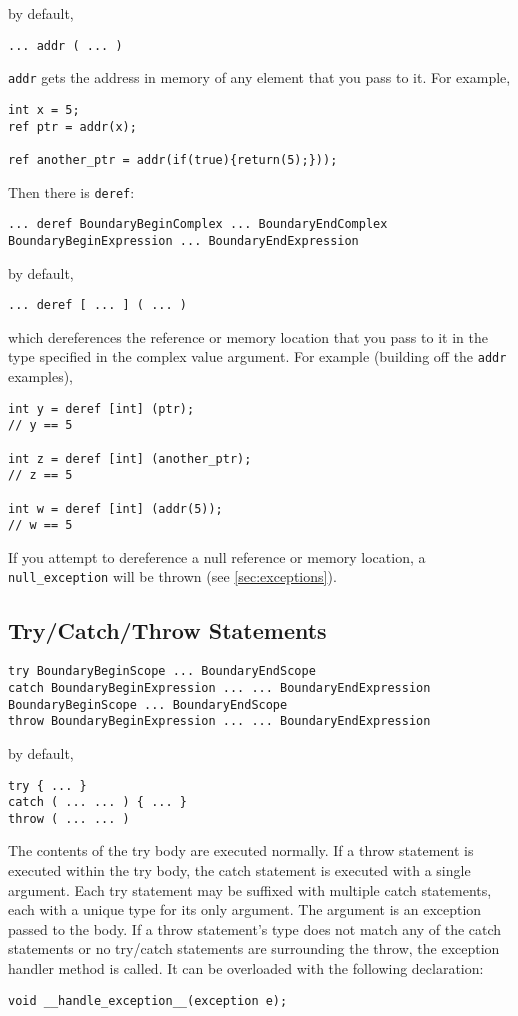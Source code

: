 \documentclass[10pt,a4paper]{article}
\begin{document}
by default,
\begin{verbatim}
... addr ( ... )
\end{verbatim}

\verb|addr| gets the address in memory of any element that you pass to it. For example,
\begin{verbatim}
int x = 5;
ref ptr = addr(x);

ref another_ptr = addr(if(true){return(5);}));
\end{verbatim}

Then there is \verb|deref|:
\begin{verbatim}
... deref BoundaryBeginComplex ... BoundaryEndComplex BoundaryBeginExpression ... BoundaryEndExpression
\end{verbatim}

by default,
\begin{verbatim}
... deref [ ... ] ( ... )
\end{verbatim}

which dereferences the reference or memory location that you pass to it in the type specified in the complex value argument. For example (building off the \verb|addr| examples),
\begin{verbatim}
int y = deref [int] (ptr);
// y == 5

int z = deref [int] (another_ptr);
// z == 5

int w = deref [int] (addr(5));
// w == 5
\end{verbatim}

If you attempt to dereference a null reference or memory location, a \verb|null_exception| will be thrown (see \ref{sec:exceptions}).

\subsection{Try/Catch/Throw Statements}
\label{sec:tryCatch}
\begin{verbatim}
try BoundaryBeginScope ... BoundaryEndScope
catch BoundaryBeginExpression ... ... BoundaryEndExpression BoundaryBeginScope ... BoundaryEndScope
throw BoundaryBeginExpression ... ... BoundaryEndExpression
\end{verbatim}

by default,
\begin{verbatim}
try { ... }
catch ( ... ... ) { ... }
throw ( ... ... )
\end{verbatim}

The contents of the try body are executed normally. If a throw statement is executed within the try body, the catch statement is executed with a single argument. Each try statement may be suffixed with multiple catch statements, each with a unique type for its only argument. The argument is an exception passed to the body. If a throw statement's type does not match any of the catch statements or no try/catch statements are surrounding the throw, the exception handler method is called. It can be overloaded with the following declaration:
\begin{verbatim}
void __handle_exception__(exception e);
\end{verbatim}
\end{document}
